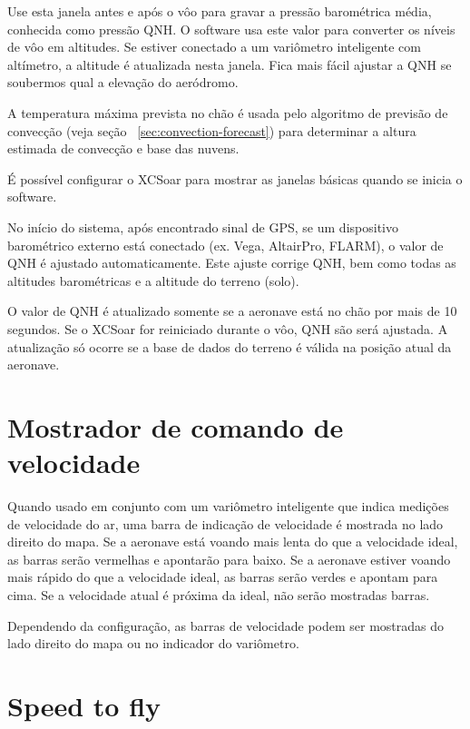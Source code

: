 Use esta janela antes e após o vôo para gravar a pressão barométrica média, conhecida como pressão QNH.  O software usa este valor para converter os níveis de vôo em altitudes.  Se estiver conectado a um variômetro inteligente com altímetro, a altitude é atualizada nesta janela.  Fica mais fácil ajustar a QNH se soubermos qual a elevação do aeródromo.

A temperatura máxima prevista no chão é usada pelo algoritmo de previsão de convecção (veja seção ~\ref{sec:convection-forecast}) para determinar a altura estimada de convecção e base das nuvens.

\tip É possível configurar o XCSoar para mostrar as janelas básicas quando se inicia o software.

No início do sistema, após encontrado sinal de GPS, se um dispositivo barométrico externo está conectado (ex. Vega, AltairPro, FLARM), o valor de QNH é ajustado automaticamente.  Este ajuste corrige QNH, bem como todas as altitudes barométricas e a altitude do terreno (solo).

O valor de QNH é atualizado somente se a aeronave está no chão por mais de 10 segundos.  Se o XCSoar for reiniciado durante o vôo, QNH são será ajustada.   A atualização só ocorre se a base de dados do terreno é válida na posição atual da aeronave.

\section{Mostrador de comando de velocidade}

Quando usado em conjunto com um variômetro inteligente que indica medições de velocidade do ar, uma barra de indicação de velocidade é mostrada no lado direito do mapa.  Se a aeronave está voando mais lenta do que a velocidade ideal, as barras serão vermelhas e apontarão para baixo.  Se a aeronave estiver voando mais rápido do que a velocidade ideal, as barras serão verdes e apontam para cima.  Se a velocidade atual é próxima da ideal, não serão mostradas barras.


Dependendo da configuração, as barras de velocidade podem ser mostradas do lado direito do mapa ou no indicador do variômetro. 

\section{Speed to fly}\label{sec:stf}

